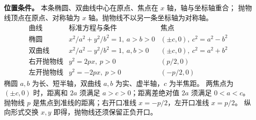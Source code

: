 \begin{statementbox}
\textbf{位置条件。} 本条椭圆、双曲线中心在原点、焦点在 $x$ 轴，轴与坐标轴重合；
抛物线顶点在原点、对称轴为 $x$ 轴。抛物线不以另一条坐标轴为对称轴。
\[
\begin{array}{c|c|c}
\text{曲线}&\text{标准方程与条件}&\text{焦点}\\\hline
\text{椭圆}&x^2/a^2+y^2/b^2=1,\ a>b>0&(\pm c,0),\ c^2=a^2-b^2\\
\text{双曲线}&x^2/a^2-y^2/b^2=1,\ a,b>0&(\pm c,0),\ c^2=a^2+b^2\\
\text{右开抛物线}&y^2=2px,\ p>0&(p/2,0)\\
\text{左开抛物线}&y^2=-2px,\ p>0&(-p/2,0)
\end{array}
\]
椭圆 $a,b$ 为长、短半轴，双曲线 $a,b$ 为实、虚半轴，$c$ 为半焦距。
两焦点为 $(\pm c,0)$ 时，距离和 $2a$ 须满足 $a>c>0$；距离差绝对值 $2a$ 须满足 $0<a<c$。
抛物线 $p$ 是焦点到准线的距离；右开口准线 $x=-p/2$，左开口准线 $x=p/2$。
纵向形式交换 $x,y$ 即得，抛物线还须保留正负开口。
\end{statementbox}
